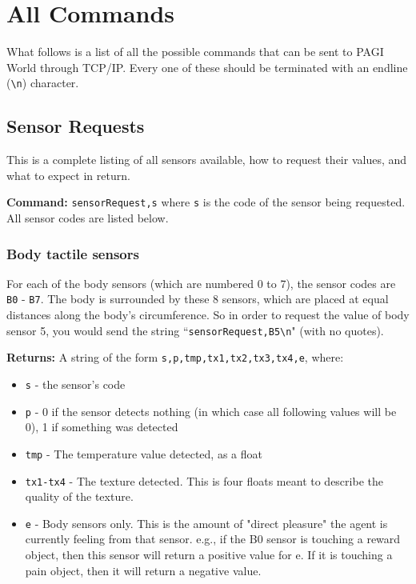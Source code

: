 \pagebreak

\section{All Commands}

What follows is a list of all the possible commands that can be sent to PAGI World through TCP/IP. Every one of these should be terminated with an endline (\texttt{\textbackslash n}) character.

\subsection{Sensor Requests}

This is a complete listing of all sensors available, how to request their values, and what to expect in return.

\noindent \textbf{Command:} \texttt{sensorRequest,s} where \texttt{s} is the code of the sensor being requested. All sensor codes are listed below.

\subsubsection{Body tactile sensors}

For each of the body sensors (which are numbered 0 to 7), the sensor codes are \texttt{B0} - \texttt{B7}. The body is surrounded by these 8 sensors, which are placed at equal distances along the body's circumference. So in order to request the value of body sensor 5, you would send the string ``\texttt{sensorRequest,B5\textbackslash n}" (with no quotes).

\noindent \textbf{Returns:} A string of the form \texttt{s,p,tmp,tx1,tx2,tx3,tx4,e}, where:
\begin{itemize}
\item \texttt{s} - the sensor's code
\item \texttt{p} - 0 if the sensor detects nothing (in which case all following values will be 0), 1 if something was detected
\item \texttt{tmp} - The temperature value detected, as a float
\item \texttt{tx1-tx4} - The texture detected. This is four floats meant to describe the quality of the texture.
\item \texttt{e} - Body sensors only. This is the amount of "direct pleasure" the agent is currently feeling from that sensor. e.g., if the B0 sensor is touching a reward object, then this sensor will return a positive value for e. If it is touching a pain object, then it will return a negative value.
\end{itemize}
	
